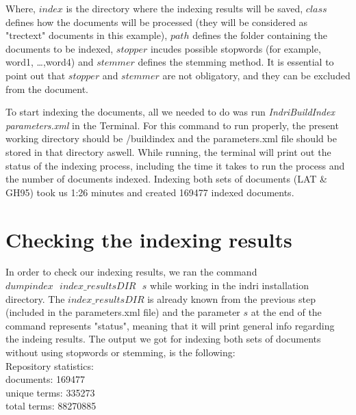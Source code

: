 \documentclass[letterpaper,11pt]{article}
\begin{document}
Where, $index$ is the directory where the indexing results will be saved, $class$ defines how the documents will be processed (they will be considered as "trectext" documents in this example), $path$ defines the folder containing the documents to be indexed, $stopper$ incudes possible stopwords (for example, word1, \dots ,word4) and $stemmer$ defines the stemming method. It is essential to point out that $stopper$ and $stemmer$ are not obligatory, and they can be excluded from the document. 

To start indexing the documents, all we needed to do was run \textit{IndriBuildIndex parameters.xml} in the Terminal. For this command to run properly, the present working directory should be /buildindex and the parameters.xml file should be stored in that directory aswell.	While running, the terminal will print out the status of the indexing process, including the time it takes to run the process and the number of documents indexed. Indexing both sets of documents (LAT \& GH95) took us 1:26 minutes and created 169477 indexed documents.

\section{Checking the indexing results}

In order to check our indexing results, we ran the command $dumpindex \text{ } index\_resultsDIR \text{ } s$ while working in the indri installation directory. The $index\_resultsDIR$ is already known from the previous step (included in the parameters.xml file) and the parameter $s$ at the end of the command represents "status", meaning that it will print general info regarding the indeing results. The output we got for indexing both sets of documents without using stopwords or stemming, is the following:\\
Repository statistics:\\
documents:	169477\\
unique terms:	335273\\
total terms:	88270885\\
\end{document}
